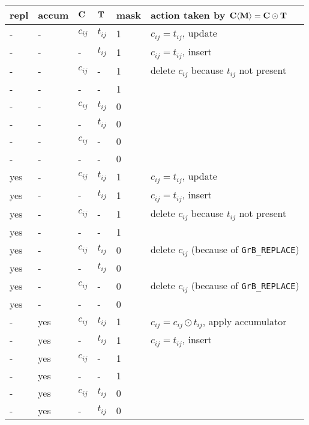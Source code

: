 \documentclass[12pt]{article}
\begin{document}
\begin{table}
{\small
\begin{tabular}{lllll|l}
\hline
repl & accum & ${\bf C}$ & ${\bf T}$ & mask & action taken by ${\bf C \langle M \rangle = C \odot T}$ \\
\hline
    -  &-   & $c_{ij}$ & $t_{ij}$  & 1    &  $c_{ij} = t_{ij}$, update \\
    -  &-   &  -       & $t_{ij}$  & 1    &  $c_{ij} = t_{ij}$, insert \\
    -  &-   & $c_{ij}$ &  -        & 1    &  delete $c_{ij}$ because $t_{ij}$ not present \\
    -  &-   &  -       &  -        & 1    &   \\
    -  &-   & $c_{ij}$ & $t_{ij}$  & 0    &   \\
    -  &-   &  -       & $t_{ij}$  & 0    &   \\
    -  &-   & $c_{ij}$ &  -        & 0    &   \\
    -  &-   &  -       &  -        & 0    &   \\
\hline
    yes&-   & $c_{ij}$ & $t_{ij}$  & 1    &  $c_{ij} = t_{ij}$, update \\
    yes&-   &  -       & $t_{ij}$  & 1    &  $c_{ij} = t_{ij}$, insert \\
    yes&-   & $c_{ij}$ &  -        & 1    &  delete $c_{ij}$ because $t_{ij}$ not present \\
    yes&-   &  -       &  -        & 1    &   \\
    yes&-   & $c_{ij}$ & $t_{ij}$  & 0    &  delete $c_{ij}$  (because of \verb'GrB_REPLACE') \\
    yes&-   &  -       & $t_{ij}$  & 0    &   \\
    yes&-   & $c_{ij}$ &  -        & 0    &  delete $c_{ij}$  (because of \verb'GrB_REPLACE') \\
    yes&-   &  -       &  -        & 0    &   \\
\hline
    -  &yes & $c_{ij}$ & $t_{ij}$  & 1    &  $c_{ij} = c_{ij} \odot t_{ij}$, apply accumulator \\
    -  &yes &  -       & $t_{ij}$  & 1    &  $c_{ij} = t_{ij}$, insert \\
    -  &yes & $c_{ij}$ &  -        & 1    &   \\
    -  &yes &  -       &  -        & 1    &   \\
    -  &yes & $c_{ij}$ & $t_{ij}$  & 0    &   \\
    -  &yes &  -       & $t_{ij}$  & 0    &   \\

\end{tabular}}
\end{table}
\end{document}
